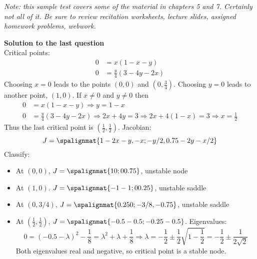 \documentclass[12pt]{exam}
\begin{document}
\textit{Note: this sample test covers some of the material in chapters 5 and 7. Certainly not all of it. Be sure to review recitation worksheets, lecture slides, assigned homework problems, webwork.}

\newpage 

\textbf{Solution to the last question} \\
Critical points: 
\begin{align}
    0 &= x(1-x-y) \\
    0 &= \frac y4 (3-4y -2x)
\end{align}
Choosing $x=0$ leads to the points $(0,0)$ and $(0,\frac 34)$. Choosing $y=0$ leads to another point, $(1,0)$. If $x\ne0$ and $y\ne0$ then 
\begin{align*}
        0 &= x(1-x-y) \Rightarrow y = 1 - x\\
    0 &= \frac y4 (3-4y -2x) \Rightarrow 2x + 4y = 3 \Rightarrow 2x + 4(1 - x) = 3 \Rightarrow x = \frac 12
\end{align*}
Thus the last critical point is $(\frac 12, \frac 12)$. Jacobian: 
$$J = \spalignmat{1-2x-y,-x;-y/2,0.75-2y-x/2}$$
Classify: 
\begin{itemize}
    \item At $(0,0)$, $J = \spalignmat{1 0;0 0.75}$, unstable node
    \item At $(1,0)$. $J = \spalignmat{-1 -1;0 0.25}$, unstable saddle
    \item At $(0,3/4)$, $J = \spalignmat{0.25 0; -3/8, -0.75}$, unstable saddle
    \item At $(\frac 12, \frac 12)$, $J = \spalignmat{-0.5 -0.5;-0.25 -0.5}$. Eigenvalues: 
    $$0 = (-0.5 - \lambda)^2 - \frac 18 = \lambda^2 + \lambda + \frac 18 \Rightarrow \lambda = -\frac12 \pm \frac 12 \sqrt{1 - \frac12}=-\frac12 \pm \frac{1}{2\sqrt{2}}$$
    Both eigenvalues real and negative, so critical point is a stable node. 
\end{itemize}
\end{document}
